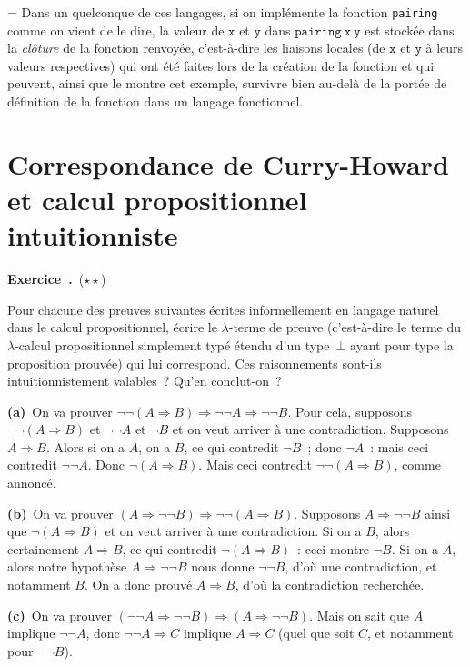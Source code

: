 \documentclass[12pt,a4paper]{article}
\theoremstyle{definition}
\newcommand\exercice{%
\refstepcounter{comcnt}\bigskip\noindent\textbf{Exercice~\thecomcnt.}}
\newif\ifcorrige
\newenvironment{corrige}%
{\ifcorrige\relax\else\setbox0=\vbox\bgroup\fi%
\smallbreak\footnotesize\noindent{\underbar{\textit{Corrigé.}}\quad}}
{{\hbox{}\nobreak\hfill\checkmark}%
\ifcorrige\relax\else\egroup\fi\par}
\begin{document}
\begin{corrige}
Dans un quelconque de ces langages, si on implémente la fonction
\texttt{pairing} comme on vient de le dire, la valeur de $\mathtt{x}$
et $\mathtt{y}$ dans $\texttt{pairing}\ \mathtt{x}\ \mathtt{y}$ est
stockée dans la \emph{clôture} de la fonction renvoyée, c'est-à-dire
les liaisons locales (de $\mathtt{x}$ et $\mathtt{y}$ à leurs valeurs
respectives) qui ont été faites lors de la création de la fonction et
qui peuvent, ainsi que le montre cet exemple, survivre bien au-delà de
la portée de définition de la fonction dans un langage fonctionnel.
\end{corrige}


%
%
%

\section{Correspondance de Curry-Howard et calcul propositionnel intuitionniste}


\exercice\ (${\star}{\star}$)\par\nobreak

Pour chacune des preuves suivantes écrites informellement en langage
naturel dans le calcul propositionnel, écrire le $\lambda$-terme de
preuve (c'est-à-dire le terme du $\lambda$-calcul propositionnel
simplement typé étendu d'un type $\bot$ ayant pour type la proposition
prouvée) qui lui correspond.  Ces raisonnements sont-ils
intuitionnistement valables ?  Qu'en conclut-on ?

\textbf{(a)} On va prouver $\neg\neg(A\Rightarrow B) \Rightarrow
\neg\neg A\Rightarrow\neg\neg B$.  Pour cela, supposons
$\neg\neg(A\Rightarrow B)$ et $\neg\neg A$ et $\neg B$ et on veut
arriver à une contradiction.  Supposons $A\Rightarrow B$.  Alors si on
a $A$, on a $B$, ce qui contredit $\neg B$ ; donc $\neg A$ : mais ceci
contredit $\neg\neg A$.  Donc $\neg(A\Rightarrow B)$.  Mais ceci
contredit $\neg\neg(A\Rightarrow B)$, comme annoncé.

\textbf{(b)} On va prouver $(A\Rightarrow\neg\neg B) \Rightarrow
\neg\neg(A\Rightarrow B)$.  Supposons $A\Rightarrow\neg\neg B$ ainsi
que $\neg(A\Rightarrow B)$ et on veut arriver à une contradiction.  Si
on a $B$, alors certainement $A\Rightarrow B$, ce qui contredit
$\neg(A\Rightarrow B)$ : ceci montre $\neg B$.  Si on a $A$, alors
notre hypothèse $A\Rightarrow\neg\neg B$ nous donne $\neg\neg B$, d'où
une contradiction, et notamment $B$.  On a donc prouvé $A\Rightarrow
B$, d'où la contradiction recherchée.

\textbf{(c)} On va prouver $(\neg\neg A\Rightarrow\neg\neg B)
\Rightarrow (A\Rightarrow\neg\neg B)$.  Mais on sait que $A$ implique
$\neg\neg A$, donc $\neg\neg A \Rightarrow C$ implique $A\Rightarrow
C$ (quel que soit $C$, et notamment pour $\neg\neg B$).
\end{document}
